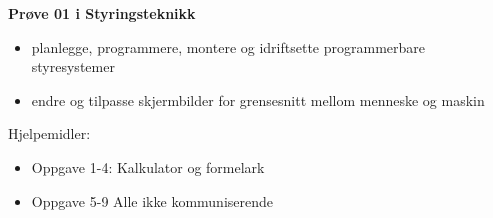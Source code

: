 
\begin{centering}
\Huge{\textbf{Prøve 01 i Styringsteknikk}}\\
\end{centering}
\vskip 2cm 
\begin{itemize}
	\item planlegge, programmere, montere og idriftsette programmerbare styresystemer
	\item endre og tilpasse skjermbilder for grensesnitt mellom menneske og maskin
\end{itemize}
\vskip 2.5pt 
Hjelpemidler:\begin{itemize}[noitemsep]
	\item Oppgave 1-4: Kalkulator og formelark
	\item Oppgave 5-9 Alle ikke kommuniserende
\end{itemize}

